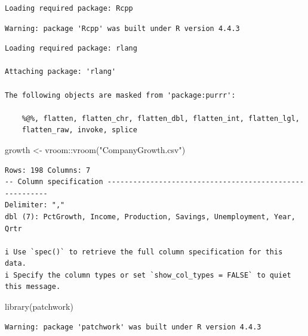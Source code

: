 \documentclass[
  letterpaper,
  DIV=11,
  numbers=noendperiod]{scrartcl}
\newenvironment{Shaded}{\begin{snugshade}}{\end{snugshade}}
\newcommand{\FunctionTok}[1]{\textcolor[rgb]{0.28,0.35,0.67}{#1}}
\newcommand{\NormalTok}[1]{\textcolor[rgb]{0.00,0.23,0.31}{#1}}
\newcommand{\OtherTok}[1]{\textcolor[rgb]{0.00,0.23,0.31}{#1}}
\newcommand{\SpecialCharTok}[1]{\textcolor[rgb]{0.37,0.37,0.37}{#1}}
\newcommand{\StringTok}[1]{\textcolor[rgb]{0.13,0.47,0.30}{#1}}
\begin{document}
\begin{verbatim}
Loading required package: Rcpp
\end{verbatim}

\begin{verbatim}
Warning: package 'Rcpp' was built under R version 4.4.3
\end{verbatim}

\begin{verbatim}
Loading required package: rlang

Attaching package: 'rlang'

The following objects are masked from 'package:purrr':

    %@%, flatten, flatten_chr, flatten_dbl, flatten_int, flatten_lgl,
    flatten_raw, invoke, splice
\end{verbatim}

\begin{Shaded}
\begin{Highlighting}[]
\NormalTok{growth }\OtherTok{\textless{}{-}}\NormalTok{ vroom}\SpecialCharTok{::}\FunctionTok{vroom}\NormalTok{(}\StringTok{"CompanyGrowth.csv"}\NormalTok{)}
\end{Highlighting}
\end{Shaded}

\begin{verbatim}
Rows: 198 Columns: 7
-- Column specification --------------------------------------------------------
Delimiter: ","
dbl (7): PctGrowth, Income, Production, Savings, Unemployment, Year, Qrtr

i Use `spec()` to retrieve the full column specification for this data.
i Specify the column types or set `show_col_types = FALSE` to quiet this message.
\end{verbatim}

\begin{Shaded}
\begin{Highlighting}[]
\FunctionTok{library}\NormalTok{(patchwork)}
\end{Highlighting}
\end{Shaded}

\begin{verbatim}
Warning: package 'patchwork' was built under R version 4.4.3
\end{verbatim}
\end{document}
